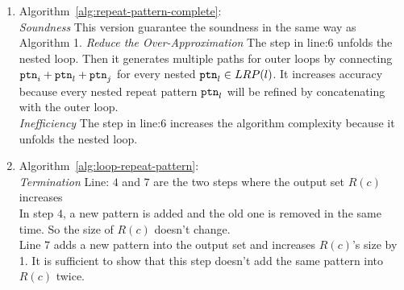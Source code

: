 \begin{enumerate}
\item
Algorithm~\ref{alg:repeat-pattern-complete}: 
\\
\emph{Soundness}
This version guarantee the soundness in the same way as Algorithm 1.
\emph{Reduce the Over-Approximation}
The step in line:6
unfolds the nested loop.
Then it generates multiple paths for outer loops by connecting $\mathtt{ptn}_i + \mathtt{ptn}_l + \mathtt{ptn}_j$ for every nested $\mathtt{ptn}_l \in LRP(l)$. 
It increases accuracy because every nested repeat pattern $\mathtt{ptn}_l$
will be refined by concatenating with the outer loop.
\\
\emph{Inefficiency}
The step in line:6 increases the algorithm complexity because it unfolds the nested loop.
\item Algorithm~\ref{alg:loop-repeat-pattern}: 
\\
\emph{Termination}
Line: $4$ and $7$ are the two steps where the output set $R(c)$ increases
\\
In step $4$, a new pattern is added and the old one is removed in the same time.
So the size of $R(c)$ doesn't change.
\\
Line $7$ adds a new pattern into the output set and increases $R(c)$'s size by 1. 
It is sufficient to show that this step
doesn't add the same pattern into $R(c)$ twice.

\end{enumerate}

